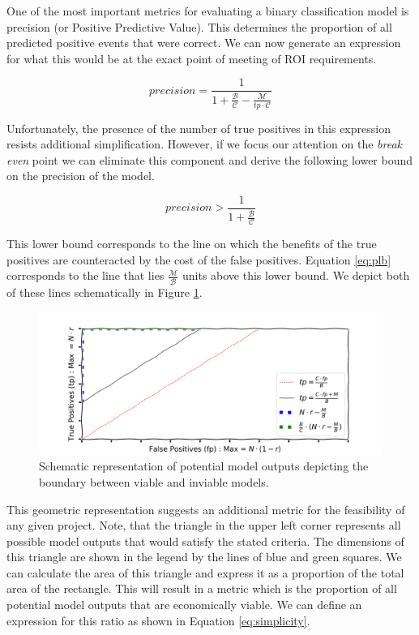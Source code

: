 \documentclass[11pt,a4paper]{article}
\begin{document}
One of the most important metrics for evaluating a binary classification model is precision (or Positive Predictive Value). This determines
the proportion of all predicted positive events that were correct. We can now generate an expression for what this would
be at the exact point of meeting of ROI requirements.

\begin{equation}
\label{eq:plb}
precision = \frac{1}{1 + \frac{\mathcal{B}}{\mathcal{C}} - \frac{\mathcal{M}}{tp \cdot \mathcal{C}}}
\end{equation}

Unfortunately, the presence of the number of true positives in this expression resists additional simplification.
However, if we focus our attention on the \textit{break even} point we can eliminate this component and derive the
following lower bound on the precision of the model.


\begin{equation}
precision > \frac{1}{1 + \frac{\mathcal{B}}{\mathcal{C}} }
\end{equation}

This lower bound corresponds to the line on which the benefits of the true positives are counteracted by the cost of the false positives.
Equation \ref{eq:plb} corresponds to the line that lies $\frac{\mathcal{M}}{\mathcal{B}}$ units above this lower bound.
We depict both of these lines schematically in Figure \ref{fig:simplicity}.

\begin{figure}[h!]
\includegraphics[scale=0.5]{images/simplicity.png}
\caption{Schematic representation of potential model outputs depicting the boundary between viable and inviable models.}
\label{fig:simplicity}
\end{figure}

This geometric representation suggests an additional metric for the feasibility of any given project.
Note, that the triangle in the upper left corner represents all possible model outputs that would satisfy
the stated criteria. The dimensions of this triangle are shown in the legend by the lines of blue and green squares.
We can calculate the area of this triangle and express it as a proportion of the total area of the
rectangle. 
This will result in a metric which is the proportion of all potential
model outputs that are economically viable.
We can define an expression for this ratio as shown in Equation \ref{eq:simplicity}.
\end{document}
